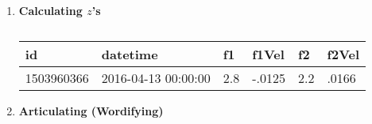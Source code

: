 \documentclass[12pt]{article}
\begin{document}
\begin{enumerate}
\item {\bf Calculating $z$'s}
\begin{table}[h!]
\centering
\begin{tabular}{|l|l|l|l|l|l|}
\hline
\rowcolor[HTML]{FFFFC7} 
id & datetime & f1 & f1Vel & f2 & f2Vel \\ \hline
1503960366 & 2016-04-13 00:00:00 & 2.8 & -.0125 & 2.2 & .0166 \\ \hline
\end{tabular}
\caption{}
\label{tab-csv}
\end{table}

\item {\bf Articulating (Wordifying)}


\end{enumerate}




\end{document}
